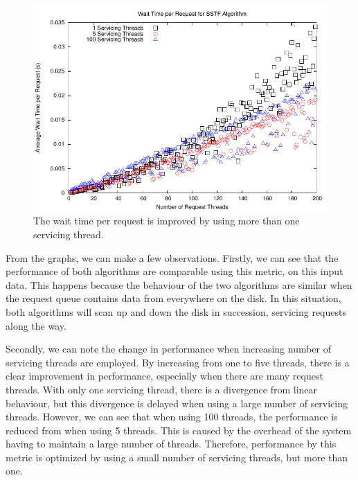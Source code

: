 \documentclass{report}
\begin{document}
\begin{figure}[htb!]
    \centering
    \includegraphics[scale=1]{waittimeSSTF.pdf}
    \caption{The wait time per request is improved by using more than one servicing thread.}
    \label{fig:waittimeSSTF}
\end{figure}
From the graphs, we can make a few observations. Firstly, we can see that the performance
of both algorithms are comparable using this metric, on this input data. This happens because
the behaviour of the two algorithms are similar when the request queue
contains data from everywhere on the disk. In this situation, both algorithms will scan up
and down the disk in succession, servicing requests along the way. 

Secondly, we can note
the change in performance when increasing number of servicing threads are employed. By
increasing from one to five threads, there is a clear improvement in  performance,
especially when there are many request threads. With only one servicing thread,
there is a divergence from linear behaviour, but this divergence is delayed when using a
large number of servicing threads. However, we can see that when using 100 threads, the
performance is reduced from when using 5 threads. This is caused by the overhead of
the system having to maintain a large number of threads. Therefore, performance by this
metric is optimized by using a small number of servicing threads, but more than one.
\end{document}
